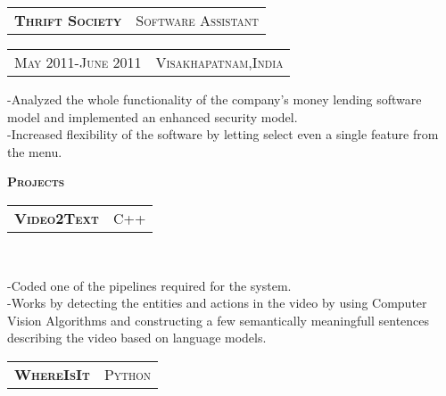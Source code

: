 \documentclass[10pt,a4paper,oneside]{article}
\begin{document}
    \vspace{-2mm}
    \begin{tabular}{c|c}
        \textbf{\normalsize T\textsc{hrift} S\textsc{ociety}}
        &\textmd{\normalsize S\textsc{oftware} A\textsc{ssistant}}
    \end{tabular}
    \hspace{2.55in}
    \textcolor{light-gray}{
        \begin{tabular}{c|c}
            {\small M\textsc{ay 2011}-J\textsc{une 2011}}
            &{\small V\textsc{isakhapatnam},I\textsc{ndia}}
        \end{tabular}
    } 
    \vspace{-4mm}
    \begin{adjustwidth}{7pt}{0pt}
        {\footnotesize -Analyzed the whole functionality of the company's money lending software model and implemented an enhanced security
        model.\\
    -Increased flexibility of the software by letting select even a single feature from the menu.}\\
    \end{adjustwidth}
    \vspace{-7pt}
    \textcolor{light-gray}{\textbf{\large P\textsc{rojects}}}
    \vspace{4pt}\\
    \begin{tabular}{c|c}
        \textbf{\normalsize V\textsc{ideo}2T\textsc{ext}}
        &\textmd{\normalsize C\textsc{++}}
    \end{tabular}\\
    \vspace{-4mm}
    \begin{adjustwidth}{7pt}{0pt}
        {\footnotesize -Coded one of the pipelines required
        for the system.\\
        -Works by detecting the entities and actions in the
        video by using Computer Vision Algorithms and constructing a few
        semantically meaningfull sentences describing the video
        based on language models.}\\
    \end{adjustwidth}
    \vspace{-6pt}
    \begin{tabular}{c|c}
        \textbf{\normalsize W\textsc{here}I\textsc{s}I\textsc{t}}
        &\textmd{\normalsize P\textsc{ython}}
    \end{tabular}\\
\end{document}
